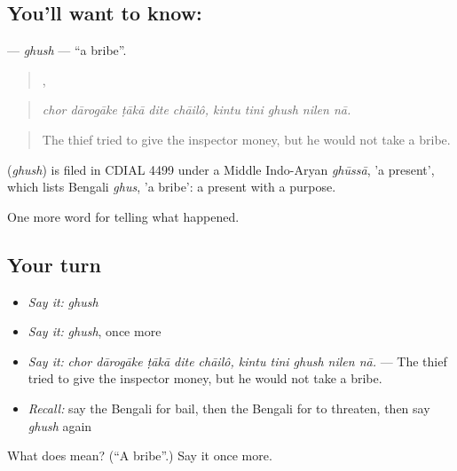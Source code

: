 \subsection*{You'll want to know: }
\textbf{} — \emph{ghush} — \textquotedblleft{}a bribe\textquotedblright{}.

\begin{quote}
    ,     
\end{quote}

\begin{quote}
\emph{chor dārogāke ṭākā dite chāilô, kintu tini ghush nilen nā.}
\end{quote}

\begin{quote}
The thief tried to give the inspector money, but he would not take a bribe.
\end{quote}

\begin{cousinweb}
\textbf{} (\emph{ghush}) is filed in CDIAL 4499 under a Middle Indo-Aryan \emph{ghūssā}, 'a present', which lists Bengali \emph{ghus}, 'a bribe': a present with a purpose.
\end{cousinweb}

\begin{grammarlens}[title={What you've built}]
One more word for telling what happened.
\end{grammarlens}

\subsection*{Your turn}
\begin{itemize}
\raggedright
  \item \emph{Say it:} \emph{ghush}
  \item \emph{Say it:} \emph{ghush}, once more
  \item \emph{Say it:} \emph{chor dārogāke ṭākā dite chāilô, kintu tini ghush nilen nā.} — The thief tried to give the inspector money, but he would not take a bribe.
  \item \emph{Recall:} say the Bengali for bail, then the Bengali for to threaten, then say \emph{ghush} again
\end{itemize}

\begin{tcolorbox}[breakable,colback=teal!4,colframe=teal!35!black,title={Before you move on}]
What does  mean? (\textquotedblleft{}A bribe\textquotedblright{}.) Say it once more.
\end{tcolorbox}
